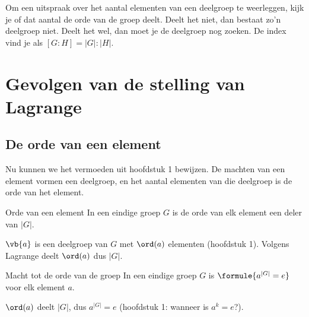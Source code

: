 \begin{werkwijze}
Om een uitspraak over het aantal elementen van een deelgroep te weerleggen, kijk je of dat aantal de orde van de groep deelt. Deelt het niet, dan bestaat zo'n deelgroep niet. Deelt het wel, dan moet je de deelgroep nog zoeken. De index vind je als $[G : H] = |G| : |H|$.
\end{werkwijze}

\begin{oefeningen}
\end{oefeningen}

\section{Gevolgen van de stelling van Lagrange}

\subsection{De orde van een element}

Nu kunnen we het vermoeden uit hoofdstuk 1 bewijzen. De machten van een element vormen een deelgroep, en het aantal elementen van die deelgroep is de orde van het element.

\begin{theorie}
\begin{stelling}{Orde van een element}
In een eindige groep $G$ is de orde van elk element een deler van $|G|$.
\end{stelling}

\begin{bewijs}
$\vb{a}$ is een deelgroep van $G$ met $\ord(a)$ elementen (hoofdstuk 1). Volgens Lagrange deelt $\ord(a)$ dus $|G|$.
\end{bewijs}
\end{theorie}

\begin{theorie}
\begin{stelling}{Macht tot de orde van de groep}
In een eindige groep $G$ is \qquad $\formule{a^{|G|} = e}$ \qquad voor elk element $a$.
\end{stelling}

\begin{bewijs}
$\ord(a)$ deelt $|G|$, dus $a^{|G|} = e$ (hoofdstuk 1: wanneer is $a^k = e$?).
\end{bewijs}
\end{theorie}

